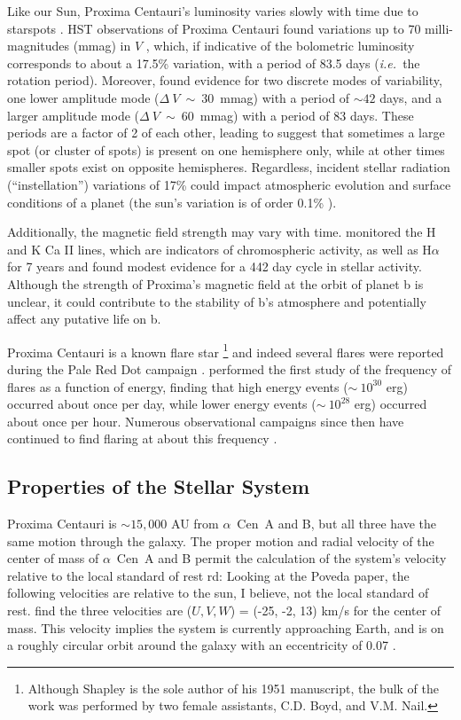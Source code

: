 \documentclass[preprint,12pt]{aastex}
\newcommand{\xxx}[1]{{\color{red} #1}} %
\def\ie{{\it i.e.\ }}
\def\acen{{$\alpha$~Cen}}
\begin{document}
Like our Sun, Proxima Centauri's luminosity varies slowly with time
due to starspots \citep{Benedict93}. HST observations of Proxima
Centauri found variations up to 70 milli-magnitudes (mmag) in $V$
\citep{Benedict98}, which, if indicative of the bolometric luminosity
corresponds to about a 17.5\% variation, with a
period of 83.5 days (\ie the rotation period). Moreover,
\citep{Benedict98} found evidence for two discrete modes of
variability, one lower amplitude mode ($\Delta~V~\sim~30$~mmag) with a
period of $\sim 42$ days, and a larger amplitude mode
($\Delta~V~\sim~60$~mmag) with a period of 83 days. These periods are
a factor of 2 of each other, leading \cite{Benedict98} to suggest that
sometimes a large spot (or cluster of spots) is present on one
hemisphere only, while at other times smaller spots exist on opposite
hemispheres. Regardless, incident stellar radiation (``instellation'')
variations of 17\% could impact atmospheric evolution and surface
conditions of a planet (the sun's variation is of order 0.1\%
\citep{Willson81}).

Additionally, the magnetic field strength may vary with
time. \cite{Cincunegui07} monitored the H and K Ca II lines, which are
indicators of chromospheric activity, as well as H$\alpha$ for 7 years
and found modest evidence for a 442 day cycle in stellar
activity. Although the strength of Proxima's magnetic field at the
orbit of planet b is unclear, it could contribute to the stability of
b's atmosphere and potentially affect any putative life on b. 

Proxima Centauri is a known flare star
\citep{Shapley51}\footnote{Although Shapley is the sole author of his
  1951 manuscript, the bulk of the work was performed by two female
  assistants, C.D. Boyd, and V.M. Nail.}  and indeed several flares
were reported during the Pale Red Dot campaign
\citep{AngladaEscude16}. \cite{Walker81} performed the first study of
the frequency of flares as a function of energy, finding that high
energy events ($\sim~10^{30}$ erg) occurred about once per day, while
lower energy events ($\sim~10^{28}$ erg) occurred about once per
hour. Numerous observational campaigns since then have continued to
find flaring at about this frequency
\citep{Benedict98,AngladaEscude16,Davenport16}.

\subsection{Properties of the Stellar System}
\label{sec:obs:stellarsys}
Proxima Centauri is $\sim 15,000$ AU from \acen~A and B, but all three have the
same motion through the galaxy. The proper motion and radial
velocity of the center of mass of \acen~A and B permit the calculation
of the system's velocity relative to the local standard of
rest \xxx{rd: Looking at the Poveda paper, the following velocities are relative to the sun,
I believe, not the 
local standard of rest}. \cite{Poveda96} find the three velocities are ($U, V, W$) =
(-25, -2, 13) km/s for the center of mass. This velocity implies the
system is currently approaching Earth, and is on a roughly circular
orbit around the galaxy with an eccentricity of 0.07
\citep{AllenHerrera98}.
\end{document}
